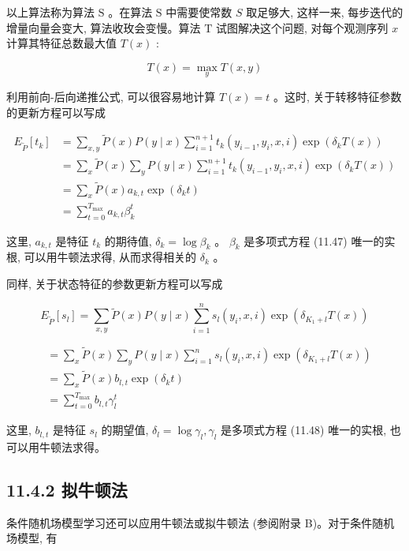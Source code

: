 \documentclass[10pt]{article}
\begin{document}
\begin{CJK*}{UTF8}{bsmi}
以上算法称为算法 $\mathrm{S}$ 。在算法 $\mathrm{S}$ 中需要使常数 $S$ 取足够大, 这样一来, 每步迭代的增量向量会变大, 算法收玫会变慢。算法 $\mathrm{T}$ 试图解决这个问题, 对每个观测序列 $x$ 计算其特征总数最大值 $T(x)$ :


\begin{equation*}
T(x)=\max _{y} T(x, y) \tag{11.46}
\end{equation*}


利用前向-后向递推公式, 可以很容易地计算 $T(x)=t$ 。这时, 关于转移特征参数的更新方程可以写成


\begin{align*}
E_{\tilde{P}}\left[t_{k}\right] & =\sum_{x, y} \tilde{P}(x) P(y \mid x) \sum_{i=1}^{n+1} t_{k}\left(y_{i-1}, y_{i}, x, i\right) \exp \left(\delta_{k} T(x)\right) \\
& =\sum_{x} \tilde{P}(x) \sum_{y} P(y \mid x) \sum_{i=1}^{n+1} t_{k}\left(y_{i-1}, y_{i}, x, i\right) \exp \left(\delta_{k} T(x)\right) \\
& =\sum_{x} \tilde{P}(x) a_{k, t} \exp \left(\delta_{k} t\right) \\
& =\sum_{t=0}^{T_{\max }} a_{k, t} \beta_{k}^{t} \tag{11.47}
\end{align*}


这里, $a_{k, t}$ 是特征 $t_{k}$ 的期待值, $\delta_{k}=\log \beta_{k}$ 。 $\beta_{k}$ 是多项式方程 (11.47) 唯一的实根, 可以用牛顿法求得, 从而求得相关的 $\delta_{k}$ 。

同样, 关于状态特征的参数更新方程可以写成

$$
E_{\tilde{P}}\left[s_{l}\right]=\sum_{x, y} \tilde{P}(x) P(y \mid x) \sum_{i=1}^{n} s_{l}\left(y_{i}, x, i\right) \exp \left(\delta_{K_{1}+l} T(x)\right)
$$


\begin{align*}
& =\sum_{x} \tilde{P}(x) \sum_{y} P(y \mid x) \sum_{i=1}^{n} s_{l}\left(y_{i}, x, i\right) \exp \left(\delta_{K_{1}+l} T(x)\right) \\
& =\sum_{x} \tilde{P}(x) b_{l, t} \exp \left(\delta_{k} t\right) \\
& =\sum_{t=0}^{T_{\max }} b_{l, t} \gamma_{l}^{t} \tag{11.48}
\end{align*}


这里, $b_{l, t}$ 是特征 $s_{l}$ 的期望值, $\delta_{l}=\log \gamma_{l}, \gamma_{l}$ 是多项式方程 (11.48) 唯一的实根, 也可以用牛顿法求得。

\subsection*{11.4.2 拟牛顿法}
条件随机场模型学习还可以应用牛顿法或拟牛顿法 (参阅附录 B)。对于条件随机场模型, 有



\end{CJK*}
\end{document}
